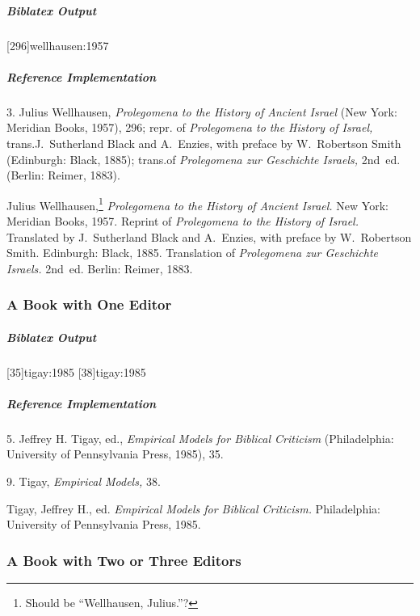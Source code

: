 \documentclass[a4paper]{article}
\newenvironment{biboutput}{%
  \subparagraph{Biblatex Output}
}{\color{black}}
\newenvironment{refimp}{%
  \subparagraph{Reference Implementation}
  \color{reference-colour}
  \rm
}{\par\color{black}}
\begin{document}
\begin{biboutput}
  \sloppy{}[296]{wellhausen:1957}
\end{biboutput}

\begin{refimp}
  \hspace*{\bibindent}3. Julius Wellhausen, \emph{Prolegomena to the History
  of Ancient Israel} (New York: Meridian Books, 1957), 296; repr. of
  \emph{Prolegomena to the History of Israel,} trans.\@ J.~Sutherland Black and
  A.~Enzies, with preface by W.~Robertson Smith (Edinburgh: Black, 1885);
  trans.\@ of \emph{Prolegomena zur Geschichte Israels,} 2nd~ed. (Berlin:
  Reimer, 1883).

  \hangindent\bibindent Julius Wellhausen,\footnote{Should be “Wellhausen,
  Julius.”?} \emph{Prolegomena to the History of Ancient Israel.} New York:
  Meridian Books, 1957. Reprint of \emph{Prolegomena to the History of
  Israel.} Translated by J.~Sutherland Black and A.~Enzies, with preface by
  W.~Robertson Smith. Edinburgh: Black, 1885. Translation of \emph{Prolegomena
  zur Geschichte Israels.} 2nd~ed. Berlin: Reimer, 1883.
\end{refimp}

\subsubsection{A Book with One Editor}

\begin{biboutput}
  [35]{tigay:1985}
  [38]{tigay:1985}
\end{biboutput}

\begin{refimp}
  \hspace*{\bibindent}5. Jeffrey H. Tigay, ed., \emph{Empirical Models for
  Biblical Criticism} (Philadelphia: University of Pennsylvania Press, 1985),
  35.

  \hspace*{\bibindent}9. Tigay, \emph{Empirical Models,} 38.

  \hangindent\bibindent Tigay, Jeffrey H., ed. \emph{Empirical Models for
  Biblical Criticism.} Philadelphia: University of Pennsylvania Press,
  1985.
\end{refimp}

\subsubsection{A Book with Two or Three Editors}
\end{document}
